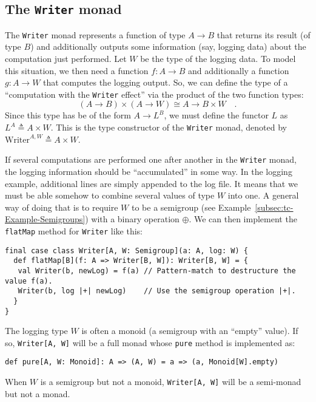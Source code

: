 \subsection{The \texttt{Writer} monad}

The \lstinline!Writer!
monad represents a function of type $A\rightarrow B$ that returns
its result (of type $B$) and additionally outputs some information
(say, logging data) about the computation just performed. Let $W$
be the type of the logging data. To model this situation, we then
need a function $f:A\rightarrow B$ and additionally a function $g:A\rightarrow W$
that computes the logging output. So, we can define the type of a
\textsf{``}computation with the \lstinline!Writer! effect\textsf{''} via the product
of the two function types:
\[
\left(A\rightarrow B\right)\times\left(A\rightarrow W\right)\cong A\rightarrow B\times W\quad.
\]
Since this type has be of the form $A\rightarrow L^{B}$, we must
define the functor $L$ as $L^{A}\triangleq A\times W$. This is the
type constructor of the \lstinline!Writer! monad, denoted by $\text{Writer}^{A,W}\triangleq A\times W$.

If several computations are performed one after another in the \lstinline!Writer!
monad, the logging information should be \textsf{``}accumulated\textsf{''} in some
way. In the logging example, additional lines are simply appended
to the log file. It means that we must be able somehow to combine
several values of type $W$ into one. A general way of doing that
is to require $W$ to be a semigroup (see Example~\ref{subsec:tc-Example-Semigroups})
with a binary operation $\oplus$. We can then implement the \lstinline!flatMap!
method for \lstinline!Writer! like this:
\begin{lstlisting}
final case class Writer[A, W: Semigroup](a: A, log: W) {
  def flatMap[B](f: A => Writer[B, W]): Writer[B, W] = {
   val Writer(b, newLog) = f(a) // Pattern-match to destructure the value f(a).
   Writer(b, log |+| newLog)    // Use the semigroup operation |+|.
  }
}
\end{lstlisting}
\begin{comment}
\[
\text{flm}_{\text{Write}}(f^{:A\rightarrow B\times W})\triangleq a\times w\rightarrow\left(\pi_{1}f(a)\right)\times\left(w\oplus\pi_{2}f(a)\right)\quad.
\]
\end{comment}

The logging type $W$ is often a monoid (a semigroup with an \textsf{``}empty\textsf{''}
value). If so, \lstinline!Writer[A, W]! will be a full monad whose
\lstinline!pure! method is implemented as:
\begin{lstlisting}
def pure[A, W: Monoid]: A => (A, W) = a => (a, Monoid[W].empty)
\end{lstlisting}
When $W$ is a semigroup but not a monoid, \lstinline!Writer[A, W]!
will be a semi-monad but not a monad. 

